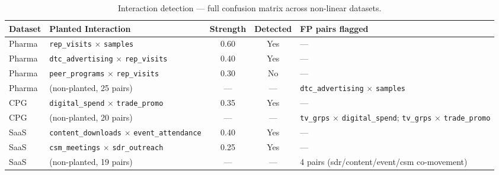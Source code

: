 \documentclass[review,12pt]{elsarticle}
\begin{document}
\begin{table}
\centering
\footnotesize
\caption{Interaction detection --- full confusion matrix across non-linear datasets.}
\label{tab:interaction_detail}
\begin{tabularx}{\linewidth}{@{}lLccL@{}}
\toprule
Dataset & Planted Interaction & Strength & Detected & FP pairs flagged \\
\midrule
Pharma & \texttt{rep\_visits} $\times$ \texttt{samples}        & 0.60 & Yes & --- \\
Pharma & \texttt{dtc\_advertising} $\times$ \texttt{rep\_visits} & 0.40 & Yes & --- \\
Pharma & \texttt{peer\_programs} $\times$ \texttt{rep\_visits}  & 0.30 & No  & --- \\
Pharma & (non-planted, 25 pairs) & --- & --- & \texttt{dtc\_advertising} $\times$ \texttt{samples} \\
CPG    & \texttt{digital\_spend} $\times$ \texttt{trade\_promo} & 0.35 & Yes & --- \\
CPG    & (non-planted, 20 pairs) & --- & --- & \texttt{tv\_grps} $\times$ \texttt{digital\_spend}; \texttt{tv\_grps} $\times$ \texttt{trade\_promo} \\
SaaS   & \texttt{content\_downloads} $\times$ \texttt{event\_attendance} & 0.40 & Yes & --- \\
SaaS   & \texttt{csm\_meetings} $\times$ \texttt{sdr\_outreach} & 0.25 & Yes & --- \\
SaaS   & (non-planted, 19 pairs) & --- & --- & 4 pairs (sdr/content/event/csm co-movement) \\
\bottomrule
\end{tabularx}
\end{table}

\begin{table}[ht]
\centering
\caption{Per-dataset precision, recall, F1 for interaction detection
         (threshold: 3\% SHAP importance, $|\rho_s| > 0.10$).}
\label{tab:interaction_summary}
\end{table}
\end{document}
